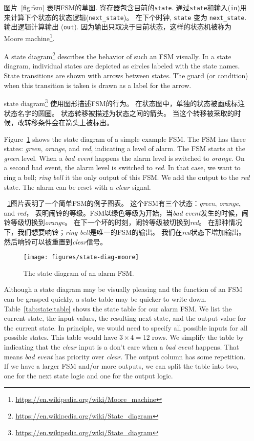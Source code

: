 \documentclass[%
    10pt,
    headinclude, footexclude,
    openright, %
    notitlepage,
    cleardoubleempty,
    headsepline,
    pointlessnumbers,
    bibtotoc, idxtotoc,
    ]{scrbook}
\newcommand{\code}[1]{{\small{\texttt{#1}}}}
\newcommand{\scale}{0.7}
\newcommand{\myref}[2]{\href{#1}{#2}}
\renewcommand{\myref}[2]{{#2}{\footnote{\url{#1}}}}
\begin{document}
图片~\ref{fig:fsm} 表明FSM的草图. 寄存器包含目前的\code{state}.
通过\code{state}和输入(\code{in})用来计算下个状态的状态逻辑(\code{next\_state})。
在下个时钟, \code{state} 变为 \code{next\_state}.
输出逻辑计算输出 (\code{out}). 因为输出只取决于目前状态，这样的状态机被称为
\myref{https://en.wikipedia.org/wiki/Moore_machine}{Moore machine}.

A \myref{https://en.wikipedia.org/wiki/State_diagram}{state diagram}
describes the behavior of such an FSM visually.
In a state diagram, individual states are depicted as circles labeled
with the state names.
State transitions are shown with arrows between states.
The guard (or condition) when this transition is taken is drawn as a label
for the arrow.

\myref{https://en.wikipedia.org/wiki/State_diagram}{state diagram}
使用图形描述FSM的行为。
在状态图中，单独的状态被画成标注状态名字的圆圈。
状态转移被描述为状态之间的箭头。
当这个转移被采取的时候，改转移条件会在箭头上被标出。

Figure~\ref{fig:diag-moore} shows the state diagram of a simple example FSM.
The FSM has three states: \emph{green}, \emph{orange}, and \emph{red},
indicating a level of alarm. The FSM starts at the \emph{green} level.
When a \emph{bad event} happens the alarm level is switched to \emph{orange}.
On a second bad event, the alarm level is switched to \emph{red}.
In that case, we want to ring a bell; \emph{ring bell} it the only output of this FSM.
We add the output to the \emph{red} state.
The alarm can be reset with a \emph{clear} signal.

~\ref{fig:diag-moore}图片表明了一个简单FSM的例子图表。
这个FSM有三个状态：\emph{green}, \emph{orange}, and \emph{red}，
表明闹铃的等级。FSM以绿色等级为开始，当\emph{bad event}发生的时候，闹铃等级切换到\emph{orange}。
在下一个坏的时刻，闹铃等级被切换到\emph{red}。
在那种情况下，我们想要响铃；\emph{ring bell}是唯一的FSM的输出。
我们在\emph{red}状态下增加输出。
然后响铃可以被重置到\emph{clear}信号。

\begin{figure}
  \centering
  \texttt{[image: figures/state-diag-moore]}
  \caption{The state diagram of an alarm FSM.}
  \label{fig:diag-moore}
\end{figure}

Although a state diagram may be visually pleasing and the function of an FSM
can be grasped quickly, a state table may be quicker to write down.
Table~\ref{tab:state:table} shows the state table for our alarm FSM.
We list the current state, the input values, the resulting next state, and
the output value for the current state. In principle, we would need to
specify all possible inputs for all possible states. This table would have
$3 \times 4 = 12$ rows. We simplify the table by indicating that the \emph{clear}
input is a don't care when a \emph{bad event} happens. That means
\emph{bad event} has priority over \emph{clear}. The output column
has some repetition. If we have a larger FSM and/or more outputs, we
can split the table into two, one for the next state logic and one for the
output logic.
\end{document}
